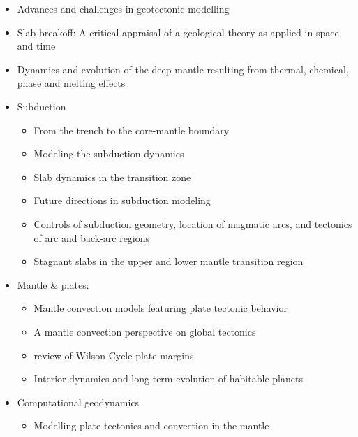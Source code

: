 \begin{itemize}
\item Advances and challenges in geotectonic modelling \cite{bufy14}
\item Slab breakoff: A critical appraisal of a geological theory as applied in space and time \cite{garm18}
\item Dynamics and evolution of the deep mantle resulting from thermal, chemical, phase and melting effects \cite{tack12}

\item Subduction
   \begin{itemize}
   \item From the trench to the core-mantle boundary \cite{kinc95}
   \item Modeling the subduction dynamics \cite{bill08}
   \item Slab dynamics in the transition zone \cite{bill10}
   \item Future directions in subduction modeling \cite{gery11}
   \item Controls of subduction geometry, location of magmatic arcs, 
         and tectonics of arc and back-arc regions \cite{crpi82}
   \item Stagnant slabs in the upper and lower mantle transition region \cite{fuwo01}
   \end{itemize}

\item Mantle \& plates:
   \begin{itemize}
   \item Mantle convection models featuring plate tectonic behavior \cite{lowm11}
   \item A mantle convection perspective on global tectonics \cite{cogu17}
   \item review of Wilson Cycle plate margins \cite{buto14}
   \item Interior dynamics and long term evolution of habitable planets \cite{taab12}
   \end{itemize}

\item Computational geodynamics
   \begin{itemize}
   \item Modelling plate tectonics and convection in the mantle \cite{mogz00}
   \end{itemize}




\end{itemize}
